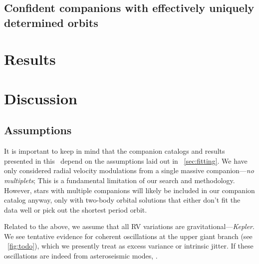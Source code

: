 \documentclass[modern, letterpaper]{aastex62}
\begin{document}



\subsection{Confident companions with effectively uniquely determined orbits}
\label{sec:catalog-unimodal}

\section{Results}
\label{sec:results}





\section{Discussion}

\subsection{Assumptions}
\label{sec:discuss-assumptions}

It is important to keep in mind that the companion catalogs and results
presented in this \documentname\ depend on the assumptions laid out in
\sectionname~\ref{sec:fitting}.
We have only considered radial velocity modulations from a single massive
companion---\emph{no multiplets}; This is a fundamental limitation of our search
and methodology.
However, stars with multiple companions will likely be included in our companion
catalog anyway, only with two-body orbital solutions that either don't fit the
data well or pick out the shortest period orbit.

Related to the above, we assume that all RV variations are
gravitational---\emph{Kepler}.
We see tentative evidence for coherent oscillations at the upper giant branch
(see \figurename~\ref{fig:todo}), which we presently treat as excess variance or
intrinsic jitter.
If these oscillations are indeed from asteroseismic modes, .
\end{document}
